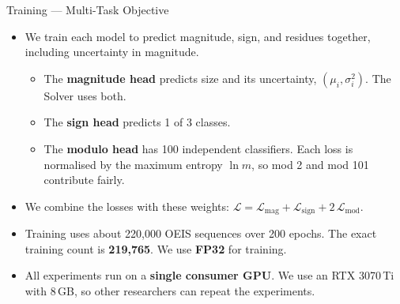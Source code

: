 \documentclass[aspectratio=169,10pt]{beamer}
\newcommand{\tightlist}{\setlength{\itemsep}{0.2em}}
\newcommand{\readout}[1]{\textcolor{readoutblue}{{\mdseries #1}}}
\begin{document}
\begin{frame}{Training --- Multi-Task Objective}
\small
  \begin{itemize}\tightlist
    \item \readout{We train each model to predict magnitude, sign, and residues together, including uncertainty in magnitude.}
      \begin{itemize}
        \item The \textbf{magnitude head} predicts size and its \alert{uncertainty},
              $(\mu_i, \sigma_i^2)$. The Solver uses both.
        \item The \textbf{sign head} predicts 1 of 3 classes.
        \item The \textbf{modulo head} has 100 independent classifiers.
              Each loss is normalised by the maximum entropy $\ln m$,
              so mod 2 and mod 101 contribute fairly.
      \end{itemize}
    \item We combine the losses with these weights:
          $\mathcal{L} = \mathcal{L}_{\mathrm{mag}} + \mathcal{L}_{\mathrm{sign}} + 2\,\mathcal{L}_{\mathrm{mod}}$.
    \item \readout{Training uses about 220,000 OEIS sequences over 200 epochs.}
          The exact training count is \textbf{219{,}765}. We use \textbf{FP32} for training.
    \item \readout{All experiments run on a \textbf{single consumer GPU}.}
          We use an RTX 3070\,Ti with 8\,GB, so other researchers can repeat the experiments.
  \end{itemize}
\end{frame}
\end{document}
